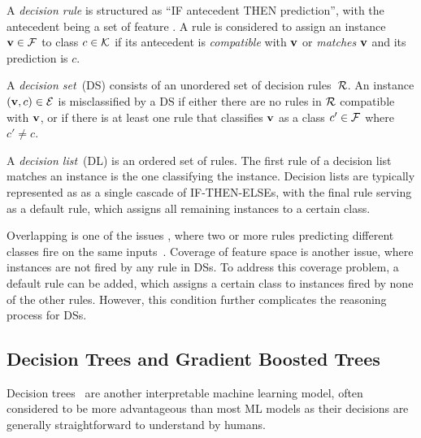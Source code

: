 A \emph{decision rule} is structured as ``IF antecedent THEN
prediction'', with the antecedent being a set of feature .
%
A rule is considered to assign an instance $\mathbf{v}\in{\mathcal{F}}$
to class $c\in{\mathcal{K}}$ if its antecedent is \emph{compatible} with
$\mathbf{v}$ or \emph{matches} $\mathbf{v}$ and its prediction is $c$.

A \emph{decision set}~(DS) consists of an unordered set
of decision rules~${\mathcal{R}}$.
%
An instance $(\mathbf{v},c)\in{\mathcal{E}}$ is misclassified by a DS if either
there are no rules in ${\mathcal{R}}$ compatible with $\mathbf{v}$, or if there
is at least one rule that classifies $\mathbf{v}$ as a class $c'\in{\mathcal{F}}$
where $c'\neq c$.

A \emph{decision list}~(DL) is an ordered set of rules.
%
The first rule of a decision list matches an instance is the one classifying the instance.
%
Decision lists are typically represented as as a single cascade of
IF-THEN-ELSEs, with the final rule serving as a default rule,
which assigns all remaining instances to a certain class.

%
Overlapping is one of the issues , where two or more rules predicting
different classes fire on the same inputs~\cite{ms-rw22,msi-fai23}.
%
Coverage of feature space is another issue, where instances are not
fired by any rule in DSs.
%
To address this coverage problem, a default rule can be added, which
assigns a certain class to instances fired by none of the other rules.
%
However, this condition further complicates the
reasoning process for DSs.

\subsection{Decision Trees and Gradient Boosted Trees}
Decision trees~\cite{rivest-ipl76,breiman-bk84,quinlan-bk93,quinlan-ml86}
are another interpretable machine learning model, often considered to be
more advantageous than most ML models as their decisions are generally
straightforward to understand by humans.


